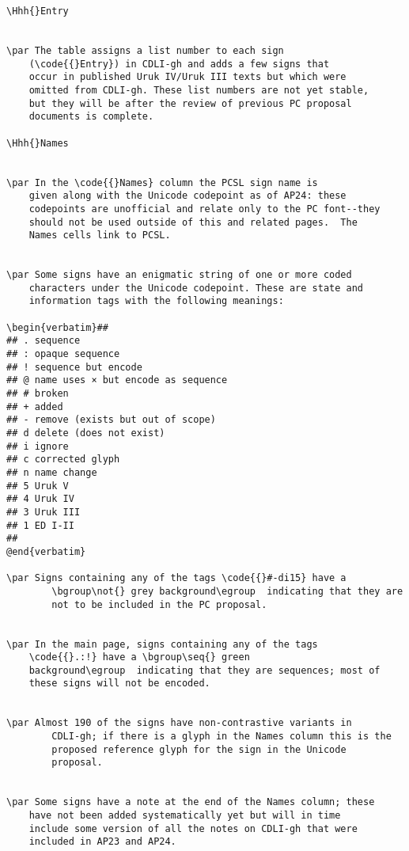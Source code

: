 \begin{verbatim}
\Hhh{}Entry


\par The table assigns a list number to each sign
	(\code{{}Entry}) in CDLI-gh and adds a few signs that
	occur in published Uruk IV/Uruk III texts but which were
	omitted from CDLI-gh. These list numbers are not yet stable,
	but they will be after the review of previous PC proposal
	documents is complete.

\Hhh{}Names


\par In the \code{{}Names} column the PCSL sign name is
	given along with the Unicode codepoint as of AP24: these
	codepoints are unofficial and relate only to the PC font--they
	should not be used outside of this and related pages.  The
	Names cells link to PCSL.


\par Some signs have an enigmatic string of one or more coded
	characters under the Unicode codepoint. These are state and
	information tags with the following meanings:

\begin{verbatim}##
## . sequence
## : opaque sequence
## ! sequence but encode
## @ name uses × but encode as sequence
## # broken
## + added
## - remove (exists but out of scope)
## d delete (does not exist)
## i ignore
## c corrected glyph
## n name change
## 5 Uruk V
## 4 Uruk IV
## 3 Uruk III
## 1 ED I-II
##
@end{verbatim}

\par Signs containing any of the tags \code{{}#-di15} have a
        \bgroup\not{} grey background\egroup  indicating that they are
        not to be included in the PC proposal.


\par In the main page, signs containing any of the tags
	\code{{}.:!} have a \bgroup\seq{} green
	background\egroup  indicating that they are sequences; most of
	these signs will not be encoded.


\par Almost 190 of the signs have non-contrastive variants in
        CDLI-gh; if there is a glyph in the Names column this is the
        proposed reference glyph for the sign in the Unicode
        proposal.


\par Some signs have a note at the end of the Names column; these
	have not been added systematically yet but will in time
	include some version of all the notes on CDLI-gh that were
	included in AP23 and AP24.


\end{verbatim}
